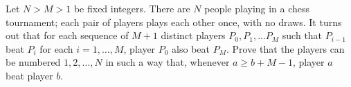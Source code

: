 Let $ N > M > 1$ be fixed integers. There are $ N$ people playing in a chess tournament; each pair of players plays each other once, with no draws. It turns out that for each sequence of $ M + 1$ distinct players $ P_0, P_1, \ldots P_M$ such that $ P_{i - 1}$ beat $ P_i$ for each $ i = 1, \ldots, M$, player $ P_0$ also beat $ P_M$. Prove that the players can be numbered $ 1,2, \ldots, N$ in such a way that, whenever $ a \geq b + M - 1$, player $ a$ beat player $ b$.